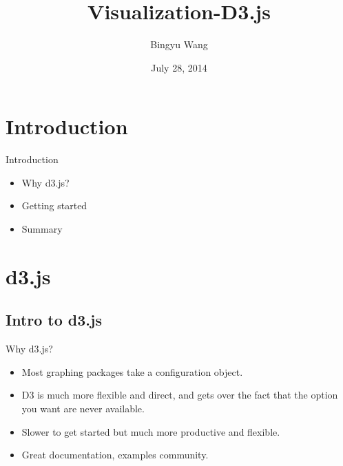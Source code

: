 \documentclass{beamer}
\title[Data Mining]{Visualization-D3.js}
\author{Bingyu Wang}
\institute{Northeastern University}
\date{July 28, 2014}
\begin{document}
\begin{frame}
  \titlepage
\end{frame}


\section{Introduction}

\begin{frame}{Introduction}

\begin{itemize}
  \item Why d3.js? 
  \item Getting started
  \item Summary
\end{itemize}

\end{frame}

\section{d3.js}

\subsection{Intro to d3.js}

\begin{frame}{Why d3.js?}

\begin{itemize}
	\item Most graphing packages take a configuration object.
	\item D3 is much more flexible and direct, and gets over the fact that the option you want are never available.
	\item Slower to get started but much more productive and flexible. 
	\item Great documentation, examples community.
\end{itemize}



\end{frame}
\end{document}
